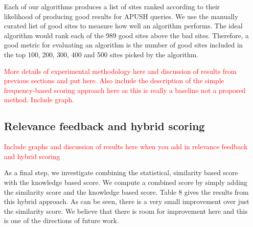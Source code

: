 \documentclass{acm_proc_article-sp}
\begin{document}
Each of our algorithms produces a list of sites ranked according to their
likelihood of producing good results for APUSH queries. We use the manually
curated list of good sites to measure how well an algorithm performs. The ideal
algorithm would rank each of the 989 good sites above the bad sites. Therefore,
a good metric for evaluating an algorithm is the number of good sites included
in the top 100, 200, 300, 400 and 500 sites picked by the algorithm. 

\textcolor{red}{More details of experimental methodology here and discussion
  of results from previous sections and put here. Also include the description
  of the simple frequency-based scoring approach here as this is really a baseline
  not a proposed method. Include graph.}  



\subsection{Relevance feedback and hybrid scoring}

\textcolor{red}{Include graphs and discussion of results here when you add in
  relevance feedback and hybrid scoring}

As a final step, we investigate combining the statistical, similarity based
score with the knowledge based score. We compute a combined score by simply
adding the similarity score and the knowledge based score. Table 8 gives the
results from this hybrid approach. As can be seen, there is a very small
improvement over just the similarity score. We believe that there is room for
improvement here and this is one of the directions of future work. 




\end{document}
